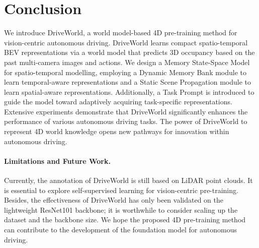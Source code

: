 \section{Conclusion}
We introduce DriveWorld, a world model-based 4D pre-training method for vision-centric autonomous driving. DriveWorld learns compact spatio-temporal BEV representations via a world model that predicts 3D occupancy based on the past multi-camera images and actions. We design a Memory State-Space Model for spatio-temporal modelling, employing a Dynamic Memory Bank module to learn temporal-aware representations and a Static Scene Propagation module to learn spatial-aware representations. Additionally, a Task Prompt is introduced to guide the model toward adaptively acquiring task-specific representations. Extensive experiments demonstrate that DriveWorld significantly enhances the performance of various autonomous driving tasks. 
The power of DriveWorld to represent 4D world knowledge opens new pathways for innovation within autonomous driving.
\paragraph{Limitations and Future Work.}
Currently, the annotation of DriveWorld is still based on LiDAR point clouds. It is essential to explore self-supervised learning for vision-centric pre-training. Besides, the effectiveness of DriveWorld has only been validated on the lightweight ResNet101 backbone; it is worthwhile to consider scaling up the dataset and the backbone size. We hope the proposed 4D pre-training method can contribute to the development of the foundation model for autonomous driving.